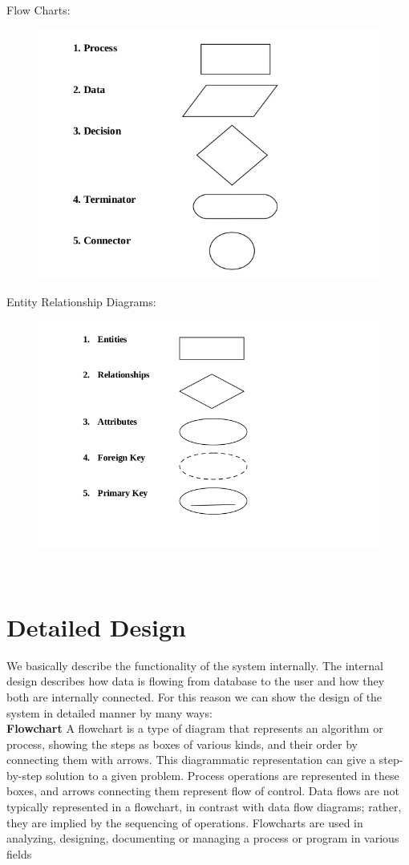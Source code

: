 \noindent Flow Charts:
\begin{figure}[h]
\centering \includegraphics[scale=0.5]{images/sss2.png}
\end{figure}
\newpage
Entity Relationship Diagrams:
\begin{figure}[h]
\centering \includegraphics[scale=0.5]{images/sss3.png}
\end{figure}\\
 \section{Detailed Design}
We basically describe the functionality of the system internally. The internal design describes how data is
flowing from database to the user and how they both are internally connected. For this reason we can show
the design of the system in detailed manner by many ways:\\
{\bf Flowchart } A flowchart is a type of diagram that represents an algorithm or process, showing the steps as boxes of various kinds, and their order by connecting them with arrows. This diagrammatic representation can give a step-by-step solution to a given problem. Process operations are represented in these boxes, and arrows connecting them represent flow of control. Data flows are not typically represented in a flowchart, in contrast with data flow diagrams; rather, they are implied by the sequencing of operations. Flowcharts are used in analyzing, designing, documenting or managing a process or program in various fields

